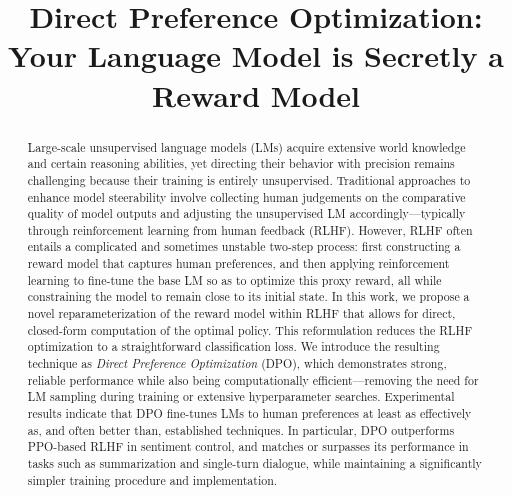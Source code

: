 \title{Direct Preference Optimization: Your Language Model is Secretly a Reward Model}

\begin{abstract}
Large-scale unsupervised language models (LMs) acquire extensive world knowledge and certain reasoning abilities, yet directing their behavior with precision remains challenging because their training is entirely unsupervised. Traditional approaches to enhance model steerability involve collecting human judgements on the comparative quality of model outputs and adjusting the unsupervised LM accordingly—typically through reinforcement learning from human feedback (RLHF). However, RLHF often entails a complicated and sometimes unstable two-step process: first constructing a reward model that captures human preferences, and then applying reinforcement learning to fine-tune the base LM so as to optimize this proxy reward, all while constraining the model to remain close to its initial state. In this work, we propose a novel reparameterization of the reward model within RLHF that allows for direct, closed-form computation of the optimal policy. This reformulation reduces the RLHF optimization to a straightforward classification loss. We introduce the resulting technique as \textit{Direct Preference Optimization} (DPO), which demonstrates strong, reliable performance while also being computationally efficient—removing the need for LM sampling during training or extensive hyperparameter searches. Experimental results indicate that DPO fine-tunes LMs to human preferences at least as effectively as, and often better than, established techniques. In particular, DPO outperforms PPO-based RLHF in sentiment control, and matches or surpasses its performance in tasks such as summarization and single-turn dialogue, while maintaining a significantly simpler training procedure and implementation.
\end{abstract}


